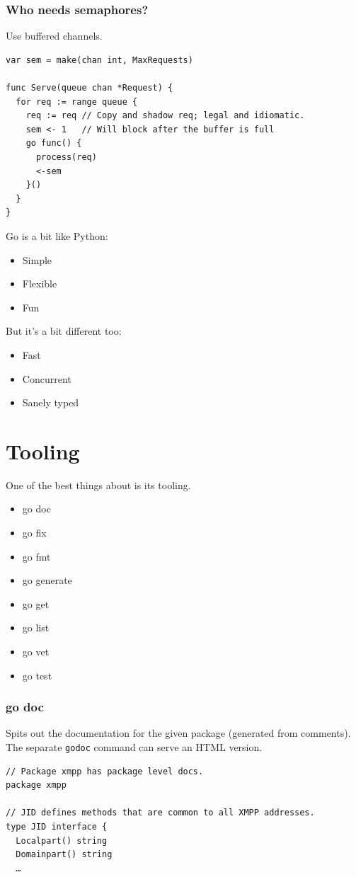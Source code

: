 \documentclass[xelatex,aspectratio=169]{beamer}
\begin{document}
\begin{frame}[fragile]
	\frametitle{Who needs semaphores?}
	Use buffered channels.
\tiny
\begin{verbatim}
var sem = make(chan int, MaxRequests)

func Serve(queue chan *Request) {
  for req := range queue {
    req := req // Copy and shadow req; legal and idiomatic.
    sem <- 1   // Will block after the buffer is full
    go func() {
      process(req)
      <-sem
    }()
  }
}
\end{verbatim}
\end{frame}

\begin{frame}
	Go is a bit like Python:
	\begin{itemize}
			\item Simple
			\item Flexible
			\item Fun
	\end{itemize}
	But it's a bit different too:
	\begin{itemize}
			\item Fast
			\item Concurrent
			\item Sanely typed
	\end{itemize}
\end{frame}


\section[]{Tooling}
\frame{\sectionpage}

\begin{frame}
	\begin{flushleft}
		One of the best things about is its tooling.
	\end{flushleft}
	\begin{itemize}
		\item go doc
		\item go fix
		\item go fmt
		\item go generate
		\item go get
		\item go list
		\item go vet
		\item go test
	\end{itemize}
\end{frame}

\begin{frame}[fragile]
	\frametitle{go doc}
	\begin{flushleft}
		Spits out the documentation for the given package (generated from comments).
		The separate \texttt{godoc} command can serve an HTML version.
	\end{flushleft}
	\renewcommand{\fcolorbox}[4][]{#4}
\begin{verbatim}
// Package xmpp has package level docs.
package xmpp

// JID defines methods that are common to all XMPP addresses.
type JID interface {
  Localpart() string
  Domainpart() string
  …
\end{verbatim}
\end{frame}
\end{document}
